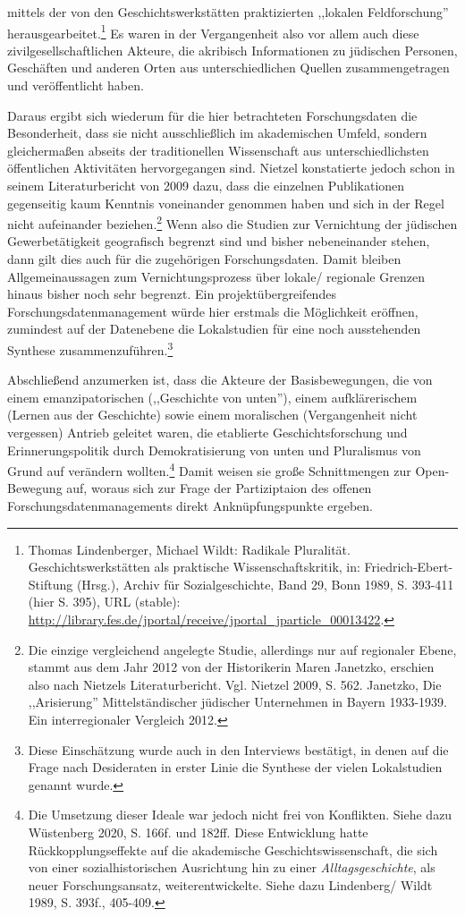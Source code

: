 mittels der von den Geschichtswerkstätten praktizierten ,,lokalen Feldforschung'' herausgearbeitet.\footnote{Thomas Lindenberger, Michael Wildt: Radikale Pluralität. Geschichtswerkstätten als praktische Wissenschaftskritik, in: Friedrich-Ebert-Stiftung (Hrsg.), Archiv für Sozialgeschichte, Band 29, Bonn 1989, S. 393-411 (hier S. 395), URL (stable): \url{http://library.fes.de/jportal/receive/jportal_jparticle_00013422}.} Es waren in der Vergangenheit also vor allem auch diese zivilgesellschaftlichen Akteure, die akribisch Informationen zu jüdischen Personen, Geschäften und anderen Orten aus unterschiedlichen Quellen zusammengetragen und veröffentlicht haben.

Daraus ergibt sich wiederum für die hier betrachteten Forschungsdaten die Besonderheit, dass sie nicht ausschließlich im akademischen Umfeld, sondern gleichermaßen abseits der traditionellen Wissenschaft aus unterschiedlichsten öffentlichen Aktivitäten hervorgegangen sind. Nietzel konstatierte jedoch schon in seinem Literaturbericht von 2009 dazu, dass die einzelnen Publikationen gegenseitig kaum Kenntnis voneinander genommen haben und sich in der Regel nicht aufeinander beziehen.\footnote{Die einzige vergleichend angelegte Studie, allerdings nur auf regionaler Ebene, stammt aus dem Jahr 2012 von der Historikerin Maren Janetzko, erschien also nach Nietzels Literaturbericht. Vgl. Nietzel 2009, S. 562. Janetzko, Die ,,Arisierung'' Mittelständischer jüdischer Unternehmen in Bayern 1933-1939. Ein interregionaler Vergleich 2012.} Wenn also die Studien zur Vernichtung der jüdischen Gewerbetätigkeit geografisch begrenzt sind und bisher nebeneinander stehen, dann gilt dies auch für die zugehörigen Forschungsdaten. Damit bleiben Allgemeinaussagen zum Vernichtungsprozess über lokale/ regionale Grenzen hinaus bisher noch sehr begrenzt. Ein projektübergreifendes Forschungsdatenmanagement würde hier erstmals die Möglichkeit eröffnen, zumindest auf der Datenebene die Lokalstudien für eine noch ausstehenden Synthese zusammenzuführen.\footnote{Diese Einschätzung wurde auch in den Interviews bestätigt, in denen auf die Frage nach Desideraten in erster Linie die Synthese der vielen Lokalstudien genannt wurde.}

Abschließend anzumerken ist, dass die Akteure der Basisbewegungen, die von einem emanzipatorischen (,,Geschichte von unten''), einem aufklärerischem (Lernen aus der Geschichte) sowie einem moralischen (Vergangenheit nicht vergessen) Antrieb geleitet waren, die etablierte Geschichtsforschung und Erinnerungspolitik durch Demokratisierung von unten und Pluralismus von Grund auf verändern wollten.\footnote{Die Umsetzung dieser Ideale war jedoch nicht frei von Konflikten. Siehe dazu Wüstenberg 2020, S. 166f. und 182ff. Diese Entwicklung hatte Rückkopplungseffekte auf die akademische Geschichtswissenschaft, die sich von einer sozialhistorischen Ausrichtung hin zu einer \textit{Alltagsgeschichte}, als neuer Forschungsansatz, weiterentwickelte. Siehe dazu Lindenberg/ Wildt 1989, S. 393f., 405-409.} Damit weisen sie große Schnittmengen zur Open-Bewegung auf, woraus sich zur Frage der Partiziptaion des offenen Forschungsdatenmanagements direkt Anknüpfungspunkte ergeben. 

